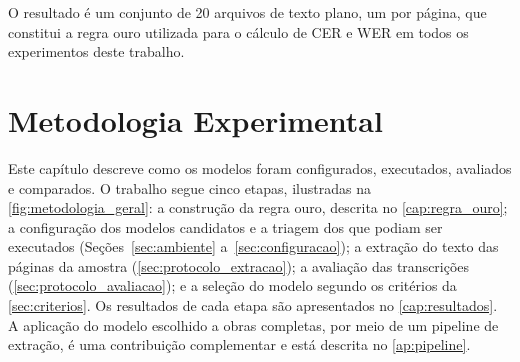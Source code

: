 \documentclass[noabntexcite,oneside]{ufsc-thesis-rn46-2019}
\begin{document}
O resultado é um conjunto de 20 arquivos de texto plano, um por página, que constitui a
regra ouro utilizada para o cálculo de CER e WER em todos os experimentos deste trabalho.

\chapter{Metodologia Experimental}
\label{cap:metodologia}

Este capítulo descreve como os modelos foram configurados, executados, avaliados e
comparados. O trabalho segue cinco etapas, ilustradas na \autoref{fig:metodologia_geral}:
a construção da regra ouro, descrita no \autoref{cap:regra_ouro}; a configuração dos modelos candidatos
e a triagem dos que podiam ser executados (Seções~\ref{sec:ambiente}
a~\ref{sec:configuracao}); a extração do texto das páginas da amostra
(\autoref{sec:protocolo_extracao}); a avaliação das transcrições
(\autoref{sec:protocolo_avaliacao}); e a seleção do modelo segundo os critérios da
\autoref{sec:criterios}. Os resultados de cada etapa são apresentados no
\autoref{cap:resultados}. A aplicação do modelo escolhido a obras completas, por meio
de um pipeline de extração, é uma contribuição complementar e está descrita no
\autoref{ap:pipeline}.
\end{document}
